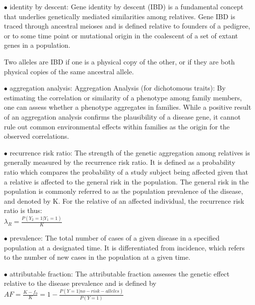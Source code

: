 \documentclass{article}
\begin{document}
\vspace{1pc}
$\bullet$ identity by descent:
Gene identity by descent (IBD) is a fundamental concept that underlies genetically mediated similarities among relatives. Gene IBD is traced through ancestral meioses and is defined relative to founders of a pedigree, or to some time point or mutational origin in the coalescent of a set of extant genes in a population.

Two alleles are IBD if one is a physical copy of the other, or if they are both physical copies of the same ancestral allele.

\vspace{1pc}
$\bullet$ aggregation analysis:
Aggregation Analysis (for dichotomous traits): By estimating the correlation or
similarity of a phenotype among family members, one can assess whether a phenotype
aggregates in families. While a positive result of an aggregation analysis
confirms the plausibility of a disease gene, it cannot rule out common environmental
effects within families as the origin for the observed correlations.


\vspace{1pc}
$\bullet$ recurrence risk ratio:
The strength of the genetic aggregation among relatives is generally measured
by the recurrence risk ratio. It is defined as a probability ratio which compares
the probability of a study subject being affected given that a relative is affected to
the general risk in the population. The general risk in the population is commonly
referred to as the population prevalence of the disease, and denoted by K. For the
relative of an affected individual, the recurrence risk ratio is thus: \\

	$
		\lambda_R = \frac{P(Y_2=1 | Y_1 = 1)}{K} 
	$




\vspace{1pc}
$\bullet$ prevalence:
The total number of cases of a given disease in a specified population at a designated time. It is differentiated from incidence, which refers to the number of new cases in the population at a given time.


\vspace{1pc}
$\bullet$ attributable fraction:
The attributable fraction assesses the genetic effect relative to the
disease prevalence and is defined by \\


  $ 
	  AF = \frac{K - f_0 }{K} = 1 - \frac{P(Y = 1 | no- risk- alleles)}{P(Y=1)} 
  $
\end{document}
